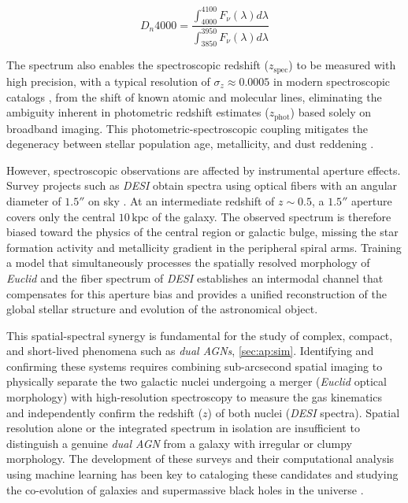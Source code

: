 \begin{equation}
D_n 4000 = \dfrac{\int_{4000}^{4100} F_{\nu}\left(\lambda\right) d\lambda}{\int_{3850}^{3950} F_{\nu}\left(\lambda\right) d\lambda}
\label{eq:dn4000}
\end{equation}

The spectrum also enables the spectroscopic redshift ($z_{\text{spec}}$) to be measured with high precision, with a typical resolution of $\sigma_z \approx 0.0005$ in modern spectroscopic catalogs \autocite{ar:desi-early-release}, from the shift of known atomic and molecular lines, eliminating the ambiguity inherent in photometric redshift estimates ($z_{\text{phot}}$) based solely on broadband imaging. This photometric-spectroscopic coupling mitigates the degeneracy between stellar population age, metallicity, and dust reddening \autocites{ar:balogh-1999}{ar:desi-early-release}.

However, spectroscopic observations are affected by instrumental aperture effects. Survey projects such as \textit{\gls{DESI}} obtain spectra using optical fibers with an angular diameter of $1.5''$ on sky \autocite{ar:desi-early-release}. At an intermediate redshift of $z \sim 0.5$, a $1.5''$ aperture covers only the central $10\,\text{kpc}$ of the galaxy. The observed spectrum is therefore biased toward the physics of the central region or galactic bulge, missing the star formation activity and metallicity gradient in the peripheral spiral arms. Training a model that simultaneously processes the spatially resolved morphology of \textit{Euclid} and the fiber spectrum of \textit{\gls{DESI}} establishes an intermodal channel that compensates for this aperture bias and provides a unified reconstruction of the global stellar structure and evolution of the astronomical object.

This spatial-spectral synergy is fundamental for the study of complex, compact, and short-lived phenomena such as \textit{dual \glspl{AGN}}, \cref{sec:ap:sim}. Identifying and confirming these systems requires combining sub-arcsecond spatial imaging to physically separate the two galactic nuclei undergoing a merger (\textit{Euclid} optical morphology) with high-resolution spectroscopy to measure the gas kinematics and independently confirm the redshift ($z$) of both nuclei (\textit{\gls{DESI}} spectra). Spatial resolution alone or the integrated spectrum in isolation are insufficient to distinguish a genuine \textit{dual \gls{AGN}} from a galaxy with irregular or clumpy morphology. The development of these surveys and their computational analysis using machine learning has been key to cataloging these candidates and studying the co-evolution of galaxies and supermassive black holes in the universe \autocites{ar:ulivi-2025}{ar:mezcua-2026}.

